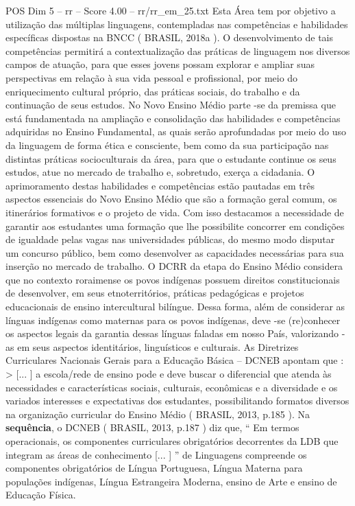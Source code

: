 \begin{textsample}{POS Dim 5 – rr – Score 4.00 – rr/rr\_em\_25.txt}
Esta Área tem por objetivo a utilização das múltiplas linguagens, contempladas nas competências e habilidades específicas dispostas na BNCC ( BRASIL, 2018a ).
O desenvolvimento de tais competências permitirá a contextualização das práticas de linguagem nos diversos campos de atuação, para que esses jovens possam explorar e ampliar suas perspectivas em relação à sua vida pessoal e profissional, por meio do enriquecimento cultural próprio, das práticas sociais, do trabalho e da continuação de seus estudos.
No Novo Ensino Médio parte -se da premissa que está fundamentada na ampliação e consolidação das habilidades e competências adquiridas no Ensino Fundamental, as quais serão aprofundadas por meio do uso da linguagem de forma ética e consciente, bem como da sua participação nas distintas práticas socioculturais da área, para que o estudante continue os seus estudos, atue no mercado de trabalho e, sobretudo, exerça a cidadania.
O aprimoramento destas habilidades e competências estão pautadas em três aspectos essenciais do Novo Ensino Médio que são a formação geral comum, os itinerários formativos e o projeto de vida.
Com isso destacamos a necessidade de garantir aos estudantes uma formação que lhe possibilite concorrer em condições de igualdade pelas vagas nas universidades públicas, do mesmo modo disputar um concurso público, bem como desenvolver as capacidades necessárias para sua inserção no mercado de trabalho.
O DCRR da etapa do Ensino Médio considera que no contexto roraimense os povos indígenas possuem direitos constitucionais de desenvolver, em seus etnoterritórios, práticas pedagógicas e projetos educacionais de ensino intercultural bilíngue.
Dessa forma, além de considerar as línguas indígenas como maternas para os povos indígenas, deve -se (re)conhecer os aspectos legais da garantia dessas línguas faladas em nosso País, valorizando -as em seus aspectos identitários, linguísticos e culturais.
As Diretrizes Curriculares Nacionais Gerais para a Educação Básica – DCNEB apontam que : > [... ] a escola/rede de ensino pode e deve buscar o diferencial que atenda às necessidades e características sociais, culturais, econômicas e a diversidade e os variados interesses e expectativas dos estudantes, possibilitando formatos diversos na organização curricular do Ensino Médio ( BRASIL, 2013, p.185 ).
Na \textbf{sequência}, o DCNEB ( BRASIL, 2013, p.187 ) diz que, “ Em termos operacionais, os componentes curriculares obrigatórios decorrentes da LDB que integram as áreas de conhecimento [... ] ” de Linguagens compreende os componentes obrigatórios de Língua Portuguesa, Língua Materna para populações indígenas, Língua Estrangeira Moderna, ensino de Arte e ensino de Educação Física.

\end{textsample}
